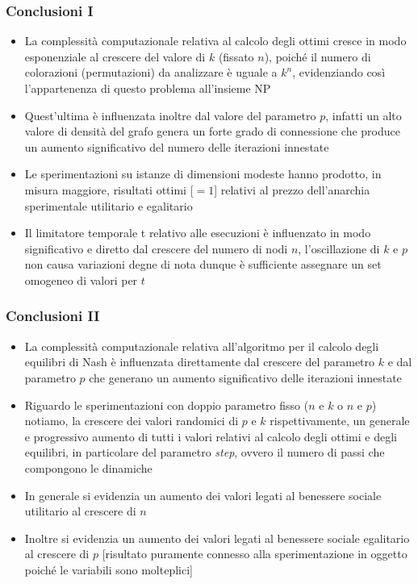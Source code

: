\documentclass{beamer}
\begin{document}
\begin{frame}
\frametitle{Conclusioni I}
\begin{itemize}
	\item La \alert{complessità computazionale} relativa al calcolo degli \alert{ottimi} cresce in modo esponenziale al \alert{crescere} del valore di \alert{$k$} (fissato $n$), poiché il numero di colorazioni (permutazioni) da analizzare è uguale a \alert{$k^n$}, evidenziando così l'appartenenza di questo problema all'insieme NP 
	\item Quest'ultima è influenzata inoltre dal valore del \alert{parametro $p$}, infatti un alto valore di \alert{densità} del grafo genera un forte grado di connessione che produce un aumento significativo del numero delle \alert{iterazioni innestate} 
	\item Le sperimentazioni su \alert{istanze} di dimensioni \alert{modeste} hanno prodotto, in misura maggiore, \alert{risultati ottimi} [\alert{$=1$}] relativi al \alert{prezzo dell'anarchia sperimentale} utilitario e egalitario
	\item Il \alert{limitatore temporale t} relativo alle esecuzioni è influenzato in modo significativo e diretto dal \alert{crescere} del \alert{numero di nodi $n$}, l'oscillazione di $k$ e $p$ non causa variazioni degne di nota dunque è sufficiente assegnare un \alert{set omogeneo} di valori per $t$
\end{itemize}
\end{frame}


\begin{frame}
\frametitle{Conclusioni II}
\begin{itemize}
	\item La \alert{complessità computazionale} relativa all'algoritmo per il calcolo degli \alert{equilibri di Nash} è influenzata direttamente dal crescere del \alert{parametro $k$} e dal \alert{parametro $p$} che generano un aumento significativo delle iterazioni innestate
	\item Riguardo le sperimentazioni con \alert{doppio parametro fisso} ($n$ e $k$ o $n$ e $p$) notiamo, la \alert{crescere} dei valori randomici di \alert{$p$} e \alert{$k$} rispettivamente, un generale e progressivo aumento di tutti i valori relativi al calcolo degli \alert{ottimi} e degli \alert{equilibri}, in particolare del parametro \textit{\alert{step}}, ovvero il numero di passi che compongono le dinamiche
	\item In generale si evidenzia un \alert{aumento} dei valori legati al benessere sociale \alert{utilitario} al crescere di \alert{$n$}
	\item Inoltre si evidenzia un \alert{aumento} dei valori legati al benessere sociale \alert{egalitario} al crescere di \alert{$p$} [risultato puramente connesso alla sperimentazione in oggetto poiché le variabili sono molteplici]
\end{itemize}
\end{frame}
\end{document}
